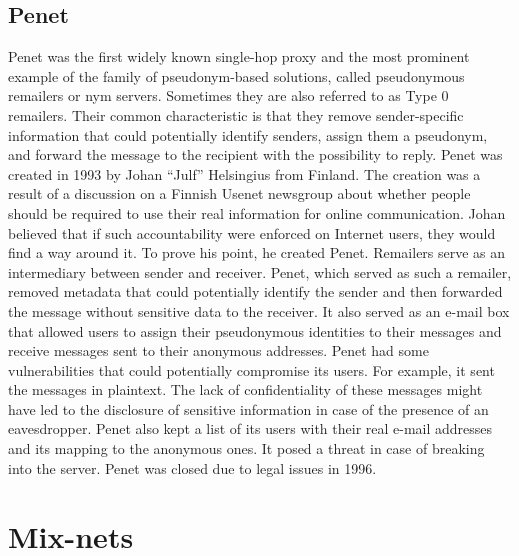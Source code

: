 \subsection{Penet}
Penet was the first widely known single-hop proxy and the most prominent example of the family of pseudonym-based solutions, called pseudonymous remailers or nym servers. Sometimes they are also referred to as Type 0 remailers. Their common characteristic is that they remove sender-specific information that could potentially identify senders, assign them a pseudonym, and forward the message to the recipient with the possibility to reply. Penet was created in 1993 by Johan “Julf” Helsingius from Finland. The creation was a result of a discussion on a Finnish Usenet newsgroup about whether people should be required to use their real information for online communication. Johan believed that if such accountability were enforced on Internet users, they would find a way around it. To prove his point, he created Penet. 
Remailers serve as an intermediary between sender and receiver. Penet, which served as such a remailer, removed metadata that could potentially identify the sender and then forwarded the message without sensitive data to the receiver. It also served as an e-mail box that allowed users to assign their pseudonymous identities to their messages and receive messages sent to their anonymous addresses.
Penet had some vulnerabilities that could potentially compromise its users. For example, it sent the messages in plaintext. The lack of confidentiality of these messages might have led to the disclosure of sensitive information in case of the presence of an eavesdropper. Penet also kept a list of its users with their real e-mail addresses and its mapping to the anonymous ones. It posed a threat in case of breaking into the server.
Penet was closed due to legal issues in 1996.

\section{Mix-nets}


